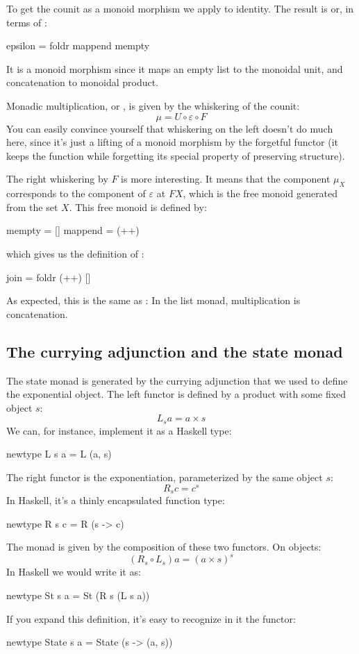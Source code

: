 \documentclass[DaoFP]{subfiles}
\begin{document}
To get the counit as a monoid morphism  we apply  to identity. The result is  or, in terms of :
\begin{haskell}
epsilon = foldr mappend mempty
\end{haskell}
It is a monoid morphism since it maps an empty list to the monoidal unit, and concatenation to monoidal product.

Monadic multiplication, or , is given by the whiskering of the counit:
\[ \mu = U \circ \varepsilon \circ F \]
You can easily convince yourself that whiskering on the left doesn't do much here, since it's just a lifting of a monoid morphism by the forgetful functor (it keeps the function while forgetting its special property of preserving structure). 

The right whiskering by $F$ is more interesting. It means that the component $\mu_X$ corresponds to the component of $\varepsilon$ at $F X$, which is the free monoid generated from the set $X$. This  free monoid is defined by:
\begin{haskell}
mempty = []
mappend = (++)
\end{haskell}
which gives us the definition of :
\begin{haskell}
join = foldr (++) []
\end{haskell}
As expected, this is the same as : In the list monad, multiplication is concatenation.

\subsection{The currying adjunction and the state monad}

The state monad is generated by the currying adjunction that we used to define the exponential object. The left functor is defined by a product with some fixed object $s$:
\[ L_s a = a \times s \]
We can, for instance, implement it as a Haskell type:
\begin{haskell}
newtype L s a = L (a, s)
\end{haskell}
The right functor is the exponentiation, parameterized by the same object $s$:
\[ R_s c = c^s \]
In Haskell, it's a thinly encapsulated function type:
\begin{haskell}
newtype R s c = R (s -> c)
\end{haskell}

The monad is given by the composition of these two functors. On objects:
\[(R_s \circ L_s) a = (a \times s)^s \]
In Haskell we would write it as:
\begin{haskell}
newtype St s a = St (R s (L s a))
\end{haskell}
If you expand this definition, it's easy to recognize in it the  functor:
\begin{haskell}
newtype State s a = State (s -> (a, s))
\end{haskell}
\end{document}
